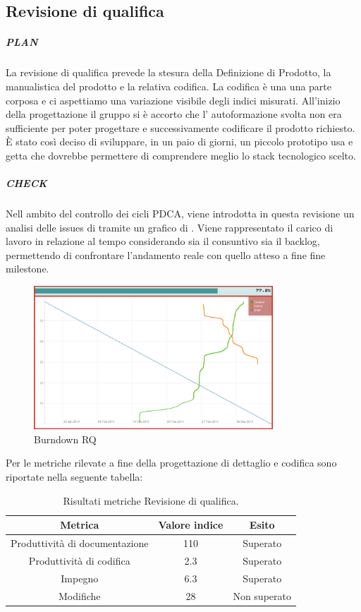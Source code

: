 \subsection{Revisione di qualifica}
	\subparagraph{PLAN}
	La revisione di qualifica prevede la stesura della Definizione di Prodotto, la manualistica del prodotto e la relativa codifica. La codifica è una una parte corposa e ci aspettiamo una variazione visibile degli indici misurati. All'inizio della progettazione il gruppo si è accorto che l' autoformazione svolta non era sufficiente per poter progettare e successivamente codificare il prodotto richiesto. \`E stato così deciso di sviluppare, in un paio di giorni, un piccolo prototipo usa e getta che dovrebbe permettere di comprendere meglio lo stack tecnologico scelto. 
	
	
	\subparagraph{CHECK}
	Nell ambito del controllo dei cicli PDCA, viene introdotta in questa revisione un analisi delle issues di  tramite un grafico di . Viene rappresentato il carico di lavoro in relazione al tempo considerando sia il consuntivo sia il backlog, permettendo di confrontare l'andamento reale con quello atteso a fine fine milestone.
	
	\begin{figure}[h]
		\centering \includegraphics[width=0.8\textwidth]{burndownRQ.png}
		\caption{Burndown RQ}
	\end{figure}
	
	
	Per le metriche rilevate a fine della progettazione di dettaglio e codifica sono riportate nella seguente tabella:
\begin{table}[H]
\centering
\begin{tabular}{ | c | c | c | }
\hline
\textbf{Metrica} & \textbf{Valore indice} & \textbf{Esito} \\
\hline
Produttività di documentazione & 110 &  Superato \\
\hline
Produttività di codifica & 2.3 &  Superato \\
\hline
Impegno & 6.3 & Superato \\
\hline
Modifiche & 28 & Non superato \\
\hline
\end{tabular}
\caption{Risultati metriche Revisione di qualifica.}
\end{table}
	
